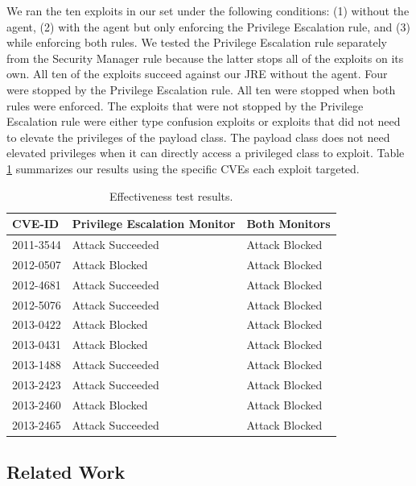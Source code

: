 \documentclass{sig-alternate}
\begin{document}
We ran the ten exploits in our set under the following conditions:
(1) without the agent, (2) with the agent but only enforcing the Privilege
Escalation rule, and (3) while enforcing both rules. We tested the Privilege Escalation rule separately from the Security Manager rule because the latter stops all of the exploits on its own. All
ten of the exploits succeed against our JRE without the agent. Four
were stopped by the Privilege Escalation rule. All ten were stopped
when both rules were enforced. The exploits that were not stopped
by the Privilege Escalation rule were either type confusion exploits
or exploits that did not need to elevate the privileges of the payload
class. The payload class does not need elevated privileges when it
can directly access a privileged class to exploit. Table \ref{tab:Exploit-experiment-summary}
summarizes our results using the specific CVEs each exploit targeted.

\begin{table}
\protect\caption{Effectiveness test results.}\label{tab:Exploit-experiment-summary}


\centering{}%
\begin{tabular}{l>{\raggedright}p{3cm}l}
\toprule 
\textbf{CVE-ID} & \textbf{Privilege Escalation Monitor} & \textbf{Both Monitors}\tabularnewline
\midrule
2011-3544 & Attack Succeeded  & Attack Blocked\tabularnewline
2012-0507 & Attack Blocked & Attack Blocked\tabularnewline
2012-4681 & Attack Succeeded  & Attack Blocked\tabularnewline
2012-5076 & Attack Succeeded  & Attack Blocked\tabularnewline
2013-0422 & Attack Blocked & Attack Blocked\tabularnewline
2013-0431 & Attack Blocked & Attack Blocked\tabularnewline
2013-1488 & Attack Succeeded  & Attack Blocked\tabularnewline
2013-2423 & Attack Succeeded  & Attack Blocked\tabularnewline
2013-2460 & Attack Blocked & Attack Blocked\tabularnewline
2013-2465 & Attack Succeeded  & Attack Blocked\tabularnewline
\bottomrule
\end{tabular}
\end{table}

\subsection{Related Work}\label{sub:Related-Work-Mitigation}
\end{document}
